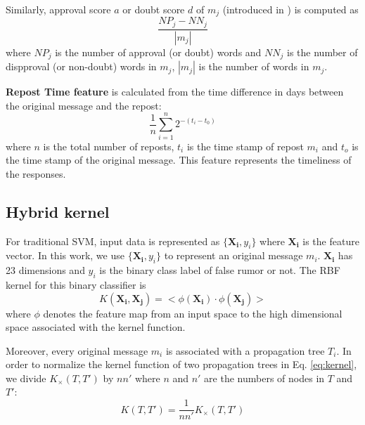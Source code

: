 Similarly, approval score $a$ or doubt score $d$ of $m_j$ (introduced in
) is computed as
\begin{equation}
\frac{NP_j - NN_j}{|m_j|}
\end{equation}
where $NP_j$ is the number of approval (or doubt) words and
$NN_j$ is the number of dispproval (or non-doubt) words
in $m_j$, $|m_j|$ is the number of words in $m_j$.

\textbf{Repost Time feature} is calculated from the time difference
in days between the original message and the repost:
\begin{equation}
\frac{1}{n}\sum_{i=1}^n 2^{-(t_i-t_0)}
\end{equation}
where $n$ is the total number of reposts, $t_i$ is the time stamp of repost
$m_i$ and $t_o$ is the time stamp of the original message. This feature
represents the timeliness of the responses.

\subsection{Hybrid kernel}
\label{sec:combined}

For traditional SVM, input data is represented as $\{\boldsymbol{X_i},y_i\}$
where $\boldsymbol{X_i}$ is the feature vector.
In this work, we use $\{\boldsymbol{X_i},y_i\}$ to represent an
original message $m_i$. $\boldsymbol{X_i}$ has 23 dimensions
and $y_i$ is the binary class label of false rumor or not.
The RBF kernel for this binary classifier is
\begin{equation}
K(\boldsymbol{X_i},\boldsymbol{X_j}) = \big<\phi(\boldsymbol{X_i}) \cdot \phi(\boldsymbol{X_j})\big>
\end{equation}
where $\phi$ denotes the feature map from an input space to
the high dimensional space associated with the kernel function.

Moreover, every original message $m_i$ is associated with
a propagation tree $T_i$.
In order to normalize the kernel function of two propagation trees
in Eq. \eqref{eq:kernel}, we divide
$K_\times(T,T')$ by $nn'$ where $n$ and $n'$ are the numbers of nodes in
$T$ and $T'$:
\begin{equation}
K(T,T') = \frac{1}{nn'}K_\times(T,T')
\end{equation}

